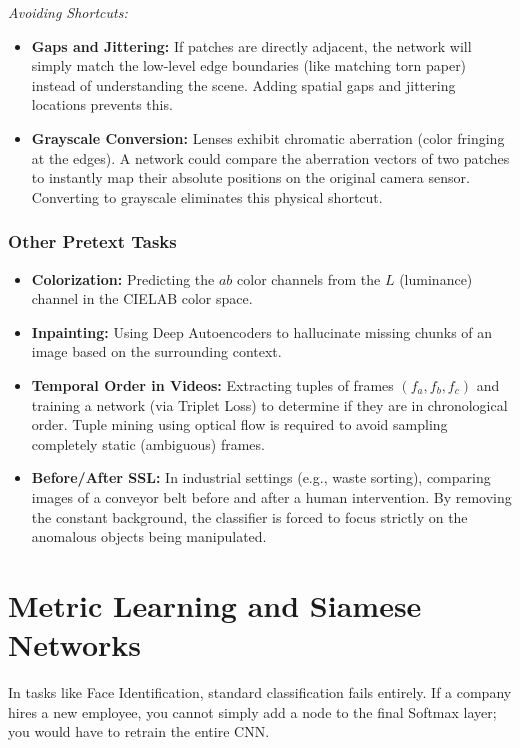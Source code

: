 \textit{Avoiding Shortcuts:} 
\begin{itemize}
    \item \textbf{Gaps and Jittering:} If patches are directly adjacent, the network will simply match the low-level edge boundaries (like matching torn paper) instead of understanding the scene. Adding spatial gaps and jittering locations prevents this.
    \item \textbf{Grayscale Conversion:} Lenses exhibit chromatic aberration (color fringing at the edges). A network could compare the aberration vectors of two patches to instantly map their absolute positions on the original camera sensor. Converting to grayscale eliminates this physical shortcut.
\end{itemize}

\subsubsection{Other Pretext Tasks}
\begin{itemize}
    \item \textbf{Colorization:} Predicting the $ab$ color channels from the $L$ (luminance) channel in the CIELAB color space.
    \item \textbf{Inpainting:} Using Deep Autoencoders to hallucinate missing chunks of an image based on the surrounding context.
    \item \textbf{Temporal Order in Videos:} Extracting tuples of frames $(f_a, f_b, f_c)$ and training a network (via Triplet Loss) to determine if they are in chronological order. Tuple mining using optical flow is required to avoid sampling completely static (ambiguous) frames.
    \item \textbf{Before/After SSL:} In industrial settings (e.g., waste sorting), comparing images of a conveyor belt before and after a human intervention. By removing the constant background, the classifier is forced to focus strictly on the anomalous objects being manipulated.
\end{itemize}

\section{Metric Learning and Siamese Networks}
\label{sec:metric_learning}

In tasks like Face Identification, standard classification fails entirely. If a company hires a new employee, you cannot simply add a node to the final Softmax layer; you would have to retrain the entire CNN. 

